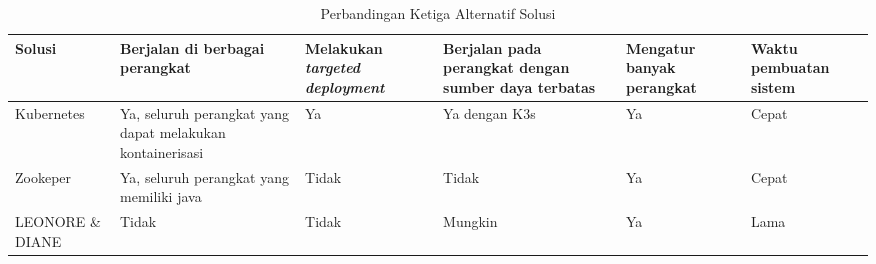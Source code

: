\bgroup
\begin{table}[ht]
  \def\arraystretch{1.3}
  \caption{Perbandingan Ketiga Alternatif Solusi}
  \label{tab:perbandingan-analisis-solusi}
  \centering
  \begin{tabular}{|p{2cm}|p{2cm}|p{2cm}|p{1.8cm}|p{1.7cm}|p{1.7cm}|}
    \hline
    Solusi           & Berjalan di berbagai perangkat                            & Melakukan \textit{targeted deployment} & Berjalan pada perangkat dengan sumber daya terbatas & Mengatur banyak perangkat & Waktu pembuatan sistem \\
    \hline
    Kubernetes       & Ya, seluruh perangkat yang dapat melakukan kontainerisasi & Ya                                     & Ya dengan K3s                                       & Ya                        & Cepat                  \\
    \hline
    Zookeper         & Ya, seluruh perangkat yang memiliki java                  & Tidak                                  & Tidak                                               & Ya                        & Cepat                  \\
    \hline
    LEONORE \& DIANE & Tidak                                                     & Tidak                                  & Mungkin                                             & Ya                        & Lama                   \\
    \hline
  \end{tabular}
\end{table}
\egroup